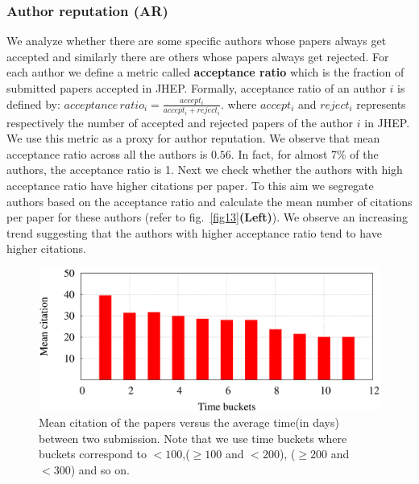 \subsubsection{Author reputation (AR)} We analyze whether there are some specific authors whose papers always get accepted and similarly there are others whose papers always get rejected.  
For each author we define a metric called {\bf acceptance ratio} which is the fraction of submitted papers accepted in JHEP. Formally, acceptance ratio of an author $i$ is defined by: $acceptance\,ratio_{i}=\frac{accept_{i}}{accept_{i} + reject_{i}}$.    
where $accept_{i}$ and $reject_{i}$ represents respectively the number of accepted and rejected papers of the author $i$ in JHEP. We use this metric as a proxy for author reputation.
We observe that mean acceptance ratio across all the authors is $0.56$. In fact, for almost 7\% of the authors, the acceptance ratio is 1. Next we check whether the authors with high acceptance ratio have higher citations per paper. To this aim we segregate authors based on the acceptance ratio and calculate the mean number of citations per paper for these authors (refer to fig.~\ref{fig13}{\bf (Left)}). We observe an increasing trend suggesting that the authors with higher acceptance ratio tend to have higher citations. 
\begin{figure}
\centering
\includegraphics[scale=0.25]{figures/prod_citation.eps}
\caption{Mean citation of the papers versus the average time(in days) between two submission. Note that  we use time buckets where buckets correspond to $<100$,($\geq 100$ and $< 200$), ($\geq 200$ and $<300$) and so on.\vspace{-2mm}}
\label{fig:prod}
\end{figure}

